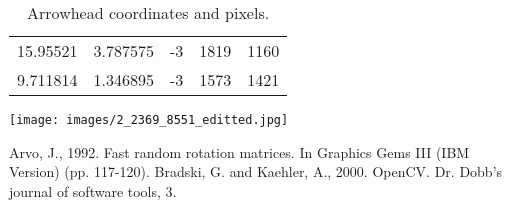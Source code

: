 \documentclass[12pt]{article}
\begin{document}
\begin{table}[t]
\begin{minipage}[]{.5\textwidth }
\begin{tabular}{|l|l|l|l|l|}
15.95521 & 3.787575 & -3 & 1819 & 1160 \\
9.711814 & 1.346895 & -3 & 1573 & 1421 \\
\hline
\end{tabular}
\caption{Arrowhead coordinates and pixels.}\label{table:arrows}
    \end{minipage}%
    \begin{minipage}[]{.5\textwidth}
        \texttt{[image: images/2\_2369\_8551\_editted.jpg]}
        \label{fig:arrows}
    \end{minipage}
\end{table}

\begin{thebibliography}{9}
Arvo, J., 1992. Fast random rotation matrices. In Graphics Gems III (IBM Version) (pp. 117-120).
Bradski, G. and Kaehler, A., 2000. OpenCV. Dr. Dobb’s journal of software tools, 3.
\end{thebibliography}
\end{document}
